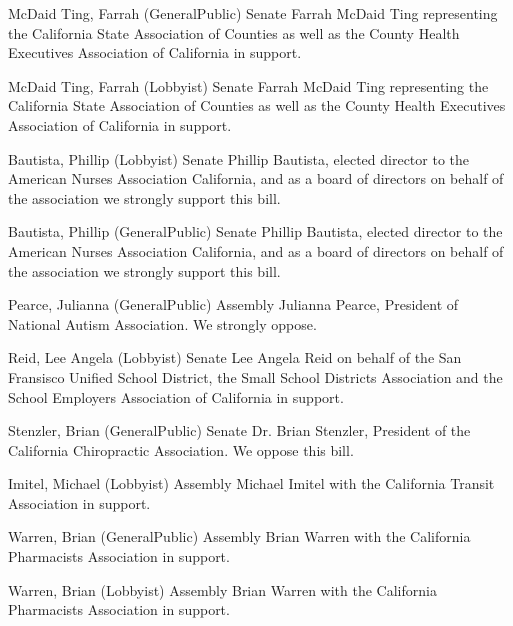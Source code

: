 \begin{result}{4.921907668723156}{McDaid Ting, Farrah (GeneralPublic) Senate}
Farrah McDaid Ting representing the California State Association of Counties as well as the County Health Executives Association of California in support.
\end{result}

\begin{result}{4.921907668723156}{McDaid Ting, Farrah (Lobbyist) Senate}
Farrah McDaid Ting representing the California State Association of Counties as well as the County Health Executives Association of California in support.
\end{result}

\begin{result}{4.902710968633834}{Bautista, Phillip (Lobbyist) Senate}
Phillip Bautista, elected director to the American Nurses Association California, and as a board of directors on behalf of the association we strongly support this bill.
\end{result}

\begin{result}{4.902710968633834}{Bautista, Phillip (GeneralPublic) Senate}
Phillip Bautista, elected director to the American Nurses Association California, and as a board of directors on behalf of the association we strongly support this bill.
\end{result}

\begin{result}{4.812498461251444}{Pearce, Julianna (GeneralPublic) Assembly}
Julianna Pearce, President of National Autism Association. We strongly oppose.
\end{result}

\begin{result}{4.792419477674715}{Reid, Lee Angela (Lobbyist) Senate}
Lee Angela Reid on behalf of the San Fransisco Unified School District, the Small School Districts Association and the School Employers Association of California in support.
\end{result}

\begin{result}{4.718879670218847}{Stenzler, Brian (GeneralPublic) Senate}
Dr. Brian Stenzler, President of the California Chiropractic Association. We oppose this bill.
\end{result}

\begin{result}{4.663139449522017}{Imitel, Michael (Lobbyist) Assembly}
Michael Imitel with the California Transit Association in support.
\end{result}

\begin{result}{4.638143430588506}{Warren, Brian (GeneralPublic) Assembly}
Brian Warren with the California Pharmacists Association in support.
\end{result}

\begin{result}{4.638143430588506}{Warren, Brian (Lobbyist) Assembly}
Brian Warren with the California Pharmacists Association in support.
\end{result}

